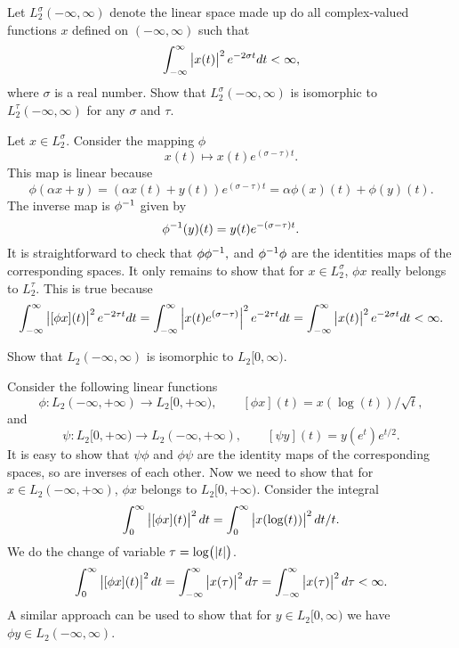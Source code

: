\begin{problem}
	Let $ L_2^\sigma(-\infty,\infty) $ denote the linear space made up do all complex-valued functions $ x $ defined on $ (-\infty,\infty) $ such that
	\[ \int_{-\infty}^{\infty}\left|x(t)\right|^2e^{-2\sigma t} dt < \infty, \]
	where $ \sigma $ is a real number. Show that $ L_2^\sigma(-\infty,\infty) $ is isomorphic to $ L_2^\tau(-\infty,\infty) $ for any $ \sigma $ and $ \tau $.
\end{problem}


\begin{solution}
	Let $ x\in L_2^\sigma $. Consider the mapping $ \phi $
	\[ x(t) \mapsto x(t)e^{(\sigma-\tau)t}. \]
	This map is linear because
	\[ \phi(\alpha x + y) = (\alpha x(t)+y(t))e^{(\sigma-\tau)t} = \alpha\phi(x)(t) + \phi(y)(t). \]
	The inverse map is $ \phi^{-1} $ given by
	\[ \phi^{-1}(y)(t) = y(t)e^{-(\sigma-\tau)t}.  \]
	It is straightforward to check that $ \phi\phi^{-1},$ and $\phi^{-1}\phi $ are the identities maps of the corresponding spaces. It only remains to show that for $ x\in L_2^\sigma $, $ \phi x $ really belongs to $ L_2^\tau $. This is true because
	\[ \int_{-\infty}^{\infty}\left|[\phi x](t)\right|^2 e^{-2\tau t}dt =\int_{-\infty}^{\infty}\left|x(t)e^{(\sigma -\tau)}\right|^2 e^{-2\tau t}dt = \int_{-\infty}^{\infty}\left|x(t)\right|^2 e^{-2\sigma t}dt < \infty.  \] 
\end{solution}


\begin{problem}
	Show that $ L_2(-\infty,\infty) $ is isomorphic to $ L_2[0,\infty). $
\end{problem}
\begin{solution}
	Consider the following linear functions
	\[ \phi: L_2(-\infty,+\infty) \to L_2[0,+\infty),\qquad [\phi x](t) = x(\log(t))/\sqrt{t}, \]
	and 
	\[ \psi: L_2[0,+\infty) \to L_2(-\infty,+\infty),\qquad [\psi y](t) = y(e^{t})e^{t/2}. \]
	It is easy to show that $ \psi\phi $ and $ \phi\psi $ are the identity maps of the corresponding spaces, so are inverses of each other.
	Now we need to show that for $ x\in L_2(-\infty,+\infty) $, $ \phi x $ belongs to $ L_2[0,+\infty) $. Consider the integral
	\[ \int_{0}^{\infty}\left|[\phi x](t)\right|^2dt = \int_{0}^{\infty}\left|x(\log(t))\right|^2 dt/t. \]
	We do the change of variable $ \tau = \log(\left|t\right|) $.
	\[ \int_{0}^{\infty}\left|[\phi x](t)\right|^2dt = \int_{-\infty}^{\infty}\left|x(\tau)\right|^2 d\tau = \int_{-\infty}^{\infty} \left|x(\tau)\right|^2 d\tau < \infty. \]
	A similar approach can be used to show that for $ y\in L_2[0,\infty) $ we have $ \phi y \in L_2(-\infty,\infty) $.
\end{solution}


